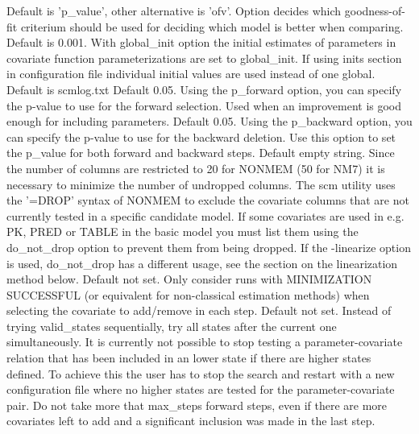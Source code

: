 \begin{optionlist}
Default is 'p\_value', other alternative is 'ofv'. Option decides which goodness-of-fit criterium should be used for deciding which model is better when comparing. 
\nextopt
{}
Default is 0.001. With global\_init option the initial estimates of parameters in covariate function parameterizations are set to global\_init. If using inits section in configuration file individual initial values are used instead of one global. 
\nextopt
{}
Default is scmlog.txt 
\nextopt
{}
Default 0.05. Using the p\_forward option, you can specify the p-value to use for the forward selection. Used when an improvement is good enough for including parameters. 
\nextopt
{}
Default 0.05. Using the p\_backward option, you can specify the p-value to use for the backward deletion. 
\nextopt
{}
Use this option to set the p\_value for both forward and backward steps. 
\nextopt
{}
Default empty string. Since the number of columns are restricted to 20 for NONMEM (50 for NM7) it is necessary to minimize the number of undropped columns. The scm utility uses the '=DROP' syntax of NONMEM to exclude the covariate columns that are not currently tested in a specific candidate model. If some covariates are used in e.g. PK, PRED or TABLE in the basic model you must list them using the do\_not\_drop option to prevent them from being dropped. If the -linearize option is used, do\_not\_drop has a different usage, see the section on the linearization method below. 
\nextopt
{}
Default not set. Only consider runs with MINIMIZATION SUCCESSFUL (or equivalent for non-classical estimation methods) when selecting the covariate to add/remove in each step. 
\nextopt
{}
Default not set. Instead of trying valid\_states sequentially, try all states after the current one simultaneously. It is currently not possible to stop testing a parameter-covariate relation that has been included in an lower state if there are higher states defined. To achieve this the user has to stop the search and restart with a new configuration file where no higher states are tested for the parameter-covariate pair. 
\nextopt
{}
Do not take more that max\_steps forward steps, even if there are more covariates left to add and a significant inclusion was made in the last step. 
\nextopt
\end{optionlist}


